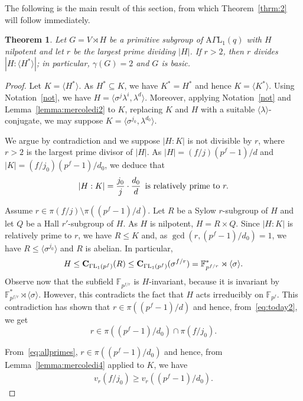 \documentclass{amsart}
\newtheorem{theorem}{Theorem}[section]
\begin{document}
The following is the main result of this section, from which Theorem~\ref{thrm:2} will follow immediately.
\begin{theorem}\label{thrm:mainmain}
Let $G=V\rtimes H$ be a primitive subgroup of $\mathrm{A}\Gamma\mathrm{L}_1(q)$
 with $H$ nilpotent and let $r$ be the largest prime dividing $|H|$. If $r>2$, then  $r$ divides $|H:\langle H^\ast\rangle|$; in particular, $\gamma(G)=2$ and $G$ is basic.
\end{theorem}
\begin{proof}
Let $K=\langle H^\ast\rangle$.
As $H^\ast\subseteq K$, we have $K^\ast=H^\ast$ and hence $K=\langle K^\ast\rangle$. Using Notation~\ref{not}, we have
$H=\langle\sigma^j\lambda^i,\lambda^d\rangle$. Moreover, applying Notation~\ref{not} and Lemma~\ref{lemma:mercoledi2} to $K$, replacing $K$ and $H$ with a suitable $\langle\lambda\rangle$-conjugate, we may suppose $K=\langle \sigma^{j_0},\lambda^{d_0}\rangle$.

We argue by contradiction and we suppose $|H:K|$ is not divisible by $r$, where $r>2$ is the largest prime divisor of $|H|$. As $|H|=(f/j)(p^f-1)/d$ and $|K|=(f/j_0)(p^f-1)/d_0$, we deduce that
\begin{equation}\label{eq:today2}
|H:K|=\frac{j_0}{j}\cdot \frac{d_0}{d}\,\hbox{ is relatively prime to }r.
\end{equation}

Assume  $r\in \pi(f/j)\setminus\pi((p^f-1)/d)$. Let $R$ be a Sylow $r$-subgroup of $H$ and let $Q$ be a Hall $r'$-subgroup of $H$. As $H$ is nilpotent, $H=R\times Q$. Since $|H:K|$ is relatively prime to $r$, we have $R\le K$ and, as $\gcd(r,(p^f-1)/d_0)=1$, we have $R\le \langle \sigma^{j_0}\rangle$ and $R$ is abelian. In particular,
$$H\le {\bf C}_{\Gamma\mathrm{L}_1(p^f)}(R)\le {\bf C}_{\Gamma\mathrm{L}_1(p^f)}(\sigma^{f/r})=\mathbb{F}_{p^{f/r}}^\ast\rtimes \langle \sigma\rangle.$$
Observe now that the subfield $\mathbb{F}_{p^{f/r}}$ is $H$-invariant, because it is invariant by $\mathbb{F}_{p^{f/r}}^\ast\rtimes \langle \sigma\rangle$. However, this contradicts the fact that $H$ acts irreducibly on $\mathbb{F}_{p^f}$. This contradiction has shown that $r\in\pi((p^f-1)/d)$ and hence, from~\eqref{eq:today2}, we get
\begin{equation}\label{eq:allprimes}
r\in \pi((p^f-1)/d_0)\cap \pi(f/j_0).
\end{equation}

 From~\eqref{eq:allprimes}, $r\in \pi((p^f-1)/d_0)$ and hence, from Lemma~\ref{lemma:mercoledi4} applied to $K$, we have
\begin{align}\label{eq:today3}
v_r(f/j_0)\ge v_r((p^f-1)/d_0).
\end{align}



\end{proof}
\end{document}
